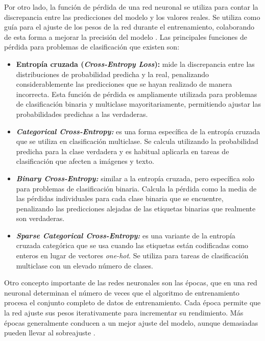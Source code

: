 Por otro lado, la función de pérdida de una red neuronal se utiliza para contar la discrepancia entre las predicciones del modelo y los valores reales. Se utiliza como guía para el ajuste de los pesos de la red durante el entrenamiento, colaborando de esta forma a mejorar la precisión del modelo \cite{funcion-perdida}. Las principales funciones de pérdida para problemas de clasificación que existen son:
\begin{itemize}
    \item \textbf{Entropía cruzada (\textit{Cross-Entropy Loss}):}
mide la discrepancia entre las distribuciones de probabilidad predicha y la real, penalizando considerablemente las predicciones que se hayan realizado de manera incorrecta. Esta función de pérdida es ampliamente utilizada para problemas de clasificación binaria y multiclase mayoritariamente, permitiendo ajustar las probabilidades predichas a las verdaderas.

\item \textbf{\textit{Categorical Cross-Entropy:}}
es una forma específica de la entropía cruzada que se utiliza en clasificación multiclase. Se calcula utilizando la probabilidad predicha para la clase verdadera y es habitual aplicarla en tareas de clasificación que afecten a imágenes y texto.

\item \textbf{\textit{Binary Cross-Entropy:}}
similar a la entropía cruzada, pero específica solo para problemas de clasificación binaria. Calcula la pérdida como la media de las pérdidas individuales para cada clase binaria que se encuentre, penalizando las predicciones alejadas de las etiquetas binarias que realmente son verdaderas.

\item \textbf{\textit{Sparse Categorical Cross-Entropy:}}
es una variante de la entropía cruzada categórica que se usa cuando las etiquetas están codificadas como enteros en lugar de vectores \textit{one-hot}. Se utiliza para tareas de clasificación multiclase con un elevado número de clases.
\end{itemize}

Otro concepto importante de las redes neuronales son las épocas, que en una red neuronal determinan el número de veces que el algoritmo de entrenamiento procesa el conjunto completo de datos de entrenamiento. Cada época permite que la red ajuste sus pesos iterativamente para incrementar su rendimiento. Más épocas generalmente conducen a un mejor ajuste del modelo, aunque demasiadas pueden llevar al sobreajuste \cite{epocas}.

